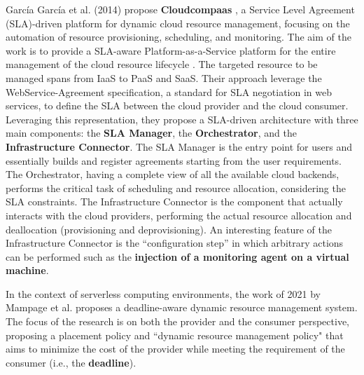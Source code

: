 García García et al. (2014) propose \textbf{Cloudcompaas} \cite{GARCIAGARCIA20141}, a Service Level Agreement (SLA)-driven platform for dynamic cloud resource management, focusing on the automation of resource provisioning, scheduling, and monitoring.
The aim of the work is to provide a SLA-aware Platform-as-a-Service platform for the entire management of the cloud resource lifecycle \cite{GARCIAGARCIA20141}.
The targeted resource to be managed spans from IaaS to PaaS and SaaS.
Their approach leverage the WebService-Agreement specification, a standard for SLA negotiation in web services, to define the SLA between the cloud provider and the cloud consumer.
Leveraging this representation, they propose a SLA-driven architecture with three main components: the \textbf{SLA Manager}, the \textbf{Orchestrator}, and the \textbf{Infrastructure Connector}.
The SLA Manager is the entry point for users and essentially builds and register agreements starting from the user requirements.
The Orchestrator, having a complete view of all the available cloud backends, performs the critical task of scheduling and resource allocation, considering the SLA constraints.
The Infrastructure Connector is the component that actually interacts with the cloud providers, performing the actual resource allocation and deallocation (provisioning and deprovisioning).
An interesting feature of the Infrastructure Connector is the ``configuration step'' in which arbitrary actions can be performed such as the \textbf{injection of a monitoring agent on a virtual machine}.
\newline

In the context of serverless computing environments, the work of 2021 by Mampage et al. \cite{9499407} proposes a deadline-aware dynamic resource management system.
The focus of the research is on both the provider and the consumer perspective, proposing a placement policy and ``dynamic resource management policy" that aims to minimize the cost of the provider while meeting the requirement of the consumer (i.e., the \textbf{deadline}).
\newline





